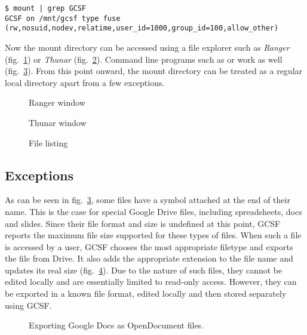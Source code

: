 \begin{lstlisting}[basicstyle=\footnotesize\ttfamily,caption=Output of mount,frame=single,label=mount_output,float]
$ mount | grep GCSF
GCSF on /mnt/gcsf type fuse (rw,nosuid,nodev,relatime,user_id=1000,group_id=100,allow_other)
\end{lstlisting}


Now the mount directory can be accessed using a file explorer such as \emph{Ranger} (fig.~\ref{fig:ranger}) or \emph{Thunar} (fig.~\ref{fig:thunar}). Command line programs such as  or  work as well (fig.~\ref{fig:ls}). From this point onward, the mount directory can be treated as a regular local directory apart from a few exceptions.

\begin{figure}[tbp]
\caption{Ranger window}
\label{fig:ranger}
\centering
{}
\end{figure}

\begin{figure}[tbp]
\caption{Thunar window}
\label{fig:thunar}
\centering
{}
\end{figure}

\begin{figure}[tbp]
  \caption{File listing}
\label{fig:ls}
\centering
{}
\end{figure}

\subsection{Exceptions}

As can be seen in fig.~\ref{fig:ls}, some files have a \codeword{#} symbol attached at the end of their name. This is the case for special Google Drive files, including spreadsheets, docs and slides. Since their file format and size is undefined at this point, GCSF reports the maximum file size supported for these types of files. When such a file is accessed by a user, GCSF chooses the most appropriate filetype and exports the file from Drive. It also adds the appropriate extension to the file name and updates its real size (fig.~\ref{fig:export_doc}). Due to the nature of such files, they cannot be edited locally and are essentially limited to read-only access. However, they can be exported in a known file format, edited locally and then stored separately using GCSF.

\begin{figure}[tbp]
\caption{Exporting Google Docs as OpenDocument files.}
\label{fig:export_doc}
\centering
{}
\end{figure}


